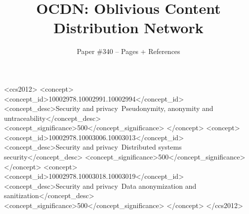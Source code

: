 \documentclass[sigconf]{acmart}
\begin{document}
\date{}
\title{OCDN: Oblivious Content Distribution Network}
\author{
{Paper \#340 -- \pageref{lastpage} Pages + References} \\
}





\begin{CCSXML}
<ccs2012>
<concept>
<concept_id>10002978.10002991.10002994</concept_id>
<concept_desc>Security and privacy~Pseudonymity, anonymity and untraceability</concept_desc>
<concept_significance>500</concept_significance>
</concept>
<concept>
<concept_id>10002978.10003006.10003013</concept_id>
<concept_desc>Security and privacy~Distributed systems security</concept_desc>
<concept_significance>500</concept_significance>
</concept>
<concept>
<concept_id>10002978.10003018.10003019</concept_id>
<concept_desc>Security and privacy~Data anonymization and sanitization</concept_desc>
<concept_significance>500</concept_significance>
</concept>
</ccs2012>
\end{CCSXML}




\maketitle










\label{lastpage} 


\balance 
\end{document}
